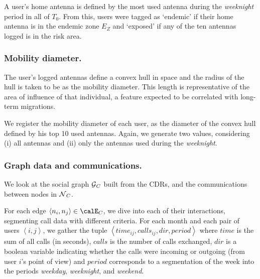 A user's home antenna is defined by the most used antenna during the \textit{weeknight} period in all of $T_0$.
From this, users were tagged as `endemic' if their home antenna is in the endemic zone $E_Z$ and `exposed' if any of the ten antennas logged is in the risk area.


\subsubsection{Mobility diameter.}

The user's logged antennas define a convex hull in space and the radius of the hull is taken to be as the mobility diameter. This length is representative of the area of influence of that individual, a feature expected to be correlated with long-term migrations.

We register the mobility diameter of each user, as the diameter of the convex hull defined by his top 10 used antennas. Again, we generate two values, considering (i) all antennas and (ii) only the antennas used during the \textit{weeknight}.



\subsubsection{Graph data and communications.}


We look at the social graph $\operatorname{\mathcal{G}}_C$ built from the CDRs, and the communications between nodes in $\operatorname{\mathcal{N}}_C$.

	For each edge $\left< n_i, n_j \right> \in \calE_C$, we dive into each of their interactions, segmenting call data with different criteria. For %
	each month and each pair of users $\left< i,j \right>$, we gather the tuple $\left< time_{ij}, calls_{ij}, dir, period \right>$ where $time$ is the sum of all calls (in seconds), $calls$ is the number of calls exchanged, $dir$ is a boolean variable indicating whether the calls were incoming or outgoing (from user $i$'s point of view) and $period$ corresponds to a segmentation of the week into the periods \textit{weekday}, \textit{weeknight}, and \textit{weekend}.


